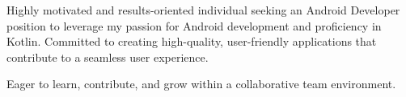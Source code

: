 \begin{cvparagraph}

    Highly motivated and results-oriented individual seeking an Android Developer position to leverage my passion for Android development and proficiency in Kotlin.
    Committed to creating high-quality, user-friendly applications that contribute to a seamless user experience.


    Eager to learn, contribute, and grow within a collaborative team environment.

\end{cvparagraph}
